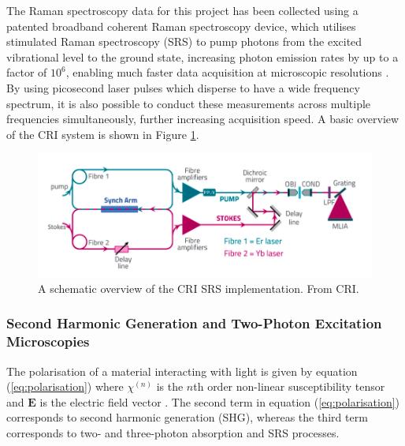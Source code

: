 The Raman spectroscopy data for this project has been collected using a patented broadband coherent Raman spectroscopy device, which utilises stimulated Raman spectroscopy (SRS) to pump photons from the excited vibrational level to the ground state, increasing photon emission rates by up to a factor of $10^6$, enabling much faster data acquisition at microscopic resolutions \cite{prince_stimulated_2017}. By using picosecond laser pulses which disperse to have a wide frequency spectrum, it is also possible to conduct these measurements across multiple frequencies simultaneously, further increasing acquisition speed. A basic overview of the CRI system is shown in Figure \ref{fig:CRI_raman}.

\begin{figure}
    \centering
    \includegraphics[width=1\linewidth]{Images/cri_raman.png}
    \caption{A schematic overview of the CRI SRS implementation. From CRI.}
    \label{fig:CRI_raman}
\end{figure}

\subsubsection{Second Harmonic Generation and Two-Photon Excitation Microscopies}
The polarisation of a material interacting with light is given by equation (\ref{eq:polarisation}) where $\chi^{(n)}$ is the $n$th order non-linear susceptibility tensor and $\mathbf E$ is the electric field vector \cite{shen_principles_2003}. The second term in equation (\ref{eq:polarisation}) corresponds to second harmonic generation (SHG), whereas the third term corresponds to two- and three-photon absorption and SRS processes.\\

